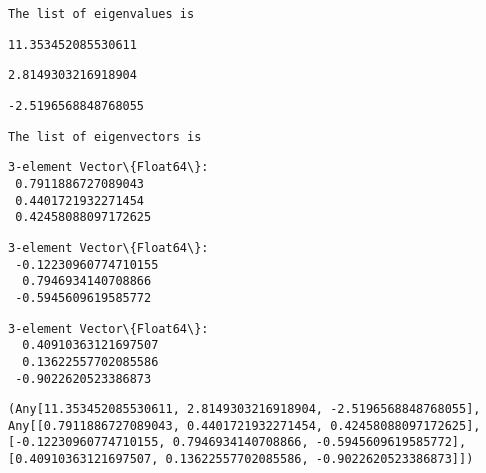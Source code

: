 \documentclass[11pt]{article}
\makeatletter
\newcommand{\boxspacing}{\kern\kvtcb@left@rule\kern\kvtcb@boxsep}
\newcommand{\prompt}[4]{
        {\ttfamily\llap{{\color{#2}[#3]:\hspace{3pt}#4}}\vspace{-\baselineskip}}
    }
\makeatother
\begin{document}
    
    \begin{Verbatim}[commandchars=\\\{\}]
The list of eigenvalues is
    \end{Verbatim}

    
    \begin{Verbatim}[commandchars=\\\{\}]
11.353452085530611
    \end{Verbatim}

    
    
    \begin{Verbatim}[commandchars=\\\{\}]
2.8149303216918904
    \end{Verbatim}

    
    
    \begin{Verbatim}[commandchars=\\\{\}]
-2.5196568848768055
    \end{Verbatim}

    
    \begin{Verbatim}[commandchars=\\\{\}]
The list of eigenvectors is
    \end{Verbatim}

    
    \begin{Verbatim}[commandchars=\\\{\}]
3-element Vector\{Float64\}:
 0.7911886727089043
 0.4401721932271454
 0.42458088097172625
    \end{Verbatim}

    
    
    \begin{Verbatim}[commandchars=\\\{\}]
3-element Vector\{Float64\}:
 -0.12230960774710155
  0.7946934140708866
 -0.5945609619585772
    \end{Verbatim}

    
    
    \begin{Verbatim}[commandchars=\\\{\}]
3-element Vector\{Float64\}:
  0.40910363121697507
  0.13622557702085586
 -0.9022620523386873
    \end{Verbatim}

    
            \begin{tcolorbox}[breakable, size=fbox, boxrule=.5pt, pad at break*=1mm, opacityfill=0]
\prompt{Out}{outcolor}{157}{\boxspacing}
\begin{Verbatim}[commandchars=\\\{\}]
(Any[11.353452085530611, 2.8149303216918904, -2.5196568848768055],
Any[[0.7911886727089043, 0.4401721932271454, 0.42458088097172625],
[-0.12230960774710155, 0.7946934140708866, -0.5945609619585772],
[0.40910363121697507, 0.13622557702085586, -0.9022620523386873]])
\end{Verbatim}
\end{tcolorbox}
        

    
    
    
\end{document}
